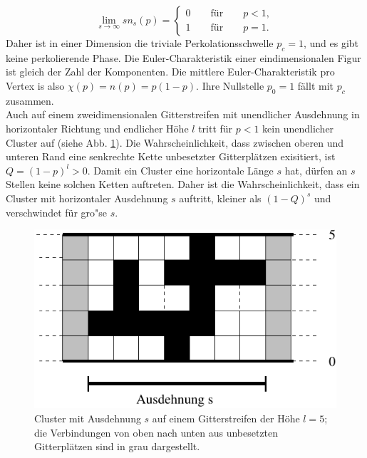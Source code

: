 \begin{equation}
\lim_{s\rightarrow{\infty}} sn_s(p)= \begin{cases} 0 \qquad \text{f\"ur} \qquad p<1, \\ 1 \qquad \text{f\"ur} \qquad p=1. \end{cases}
\end{equation}
Daher ist in einer Dimension die triviale Perkolationsschwelle $p_c=1$, und es gibt keine perkolierende Phase. Die Euler-Charakteristik einer eindimensionalen Figur ist gleich der Zahl der Komponenten. Die mittlere Euler-Charakteristik pro Vertex is also $\chi(p)=n(p)=p(1-p)$. Ihre Nullstelle $p_0=1$ f\"allt mit $p_c$ zusammen.\\
Auch auf einem zweidimensionalen Gitterstreifen mit unendlicher Ausdehnung in horizontaler Richtung und endlicher H\"ohe $l$ tritt f\"ur $p<1$ kein unendlicher Cluster auf (siehe Abb. \ref{fig:1D}). Die Wahrscheinlichkeit, dass zwischen oberen und unteren Rand eine senkrechte Kette unbesetzter Gitterpl\"atzen exisitiert, ist $Q=(1-p)^l>0$. Damit ein Cluster eine horizontale L\"ange $s$ hat, d\"urfen an $s$ Stellen keine solchen Ketten auftreten. Daher ist die Wahrscheinlichkeit, dass ein Cluster mit horizontaler Ausdehnung $s$ auftritt, kleiner als $(1-Q)^s$ und verschwindet f\"ur gro"se $s$. \\
\begin{figure}[htbp]
  \centering
  \includegraphics{./Einleitung-figs/1D}
  \caption{Cluster mit Ausdehnung $s$ auf einem Gitterstreifen der H\"ohe $l=5$; die Verbindungen von oben nach unten aus unbesetzten Gitterpl\"atzen sind in grau dargestellt. }
  \label{fig:1D}
\end{figure}
